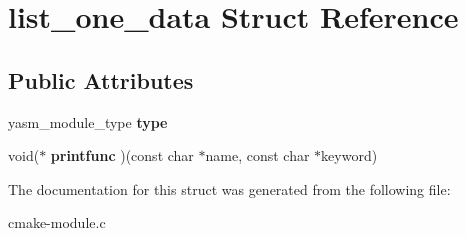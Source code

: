 \hypertarget{structlist__one__data}{\section{list\-\_\-one\-\_\-data Struct Reference}
\label{structlist__one__data}
}
\subsection*{Public Attributes}
\begin{DoxyCompactItemize}
\item 
\hypertarget{structlist__one__data_a35a07da309951b58709c2ba62f324cda}{yasm\-\_\-module\-\_\-type {\bfseries type}}\label{structlist__one__data_a35a07da309951b58709c2ba62f324cda}

\item 
\hypertarget{structlist__one__data_ad19d5b4fd4c0afa9162d86c7bd439e00}{void($\ast$ {\bfseries printfunc} )(const char $\ast$name, const char $\ast$keyword)}\label{structlist__one__data_ad19d5b4fd4c0afa9162d86c7bd439e00}

\end{DoxyCompactItemize}


The documentation for this struct was generated from the following file\-:\begin{DoxyCompactItemize}
\item 
cmake-\/module.\-c\end{DoxyCompactItemize}
